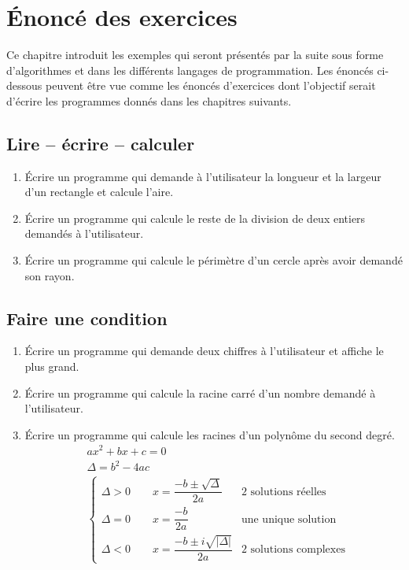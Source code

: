\chapter{Énoncé des exercices}

Ce chapitre introduit les exemples qui seront présentés par la suite sous forme d'algorithmes et dans les différents langages de programmation. Les énoncés ci-dessous peuvent être vue comme les énoncés d'exercices dont l'objectif serait d'écrire les programmes donnés dans les chapitres suivants.

\section{Lire -- écrire -- calculer}

\begin{enumerate}
    \item Écrire un programme qui demande à l'utilisateur la longueur et la largeur d'un rectangle et calcule l'aire.
    \item Écrire un programme qui calcule le reste de la division de deux entiers demandés à l'utilisateur.
    \item Écrire un programme qui calcule le périmètre d'un cercle après avoir demandé son rayon.
\end{enumerate}

\section{Faire une condition}

\begin{enumerate}
    \item Écrire un programme qui demande deux chiffres à l'utilisateur et affiche le plus grand.
    
    \item Écrire un programme qui calcule la racine carré d'un nombre demandé à l'utilisateur.
    
    \item Écrire un programme qui calcule les racines d'un polynôme du second degré.
    \begin{align*}
        & a x^2 + b x + c = 0 \\
        & \Delta = b^2 - 4 a c \\
        &
        \begin{cases}
            \Delta > 0 \qquad x = \dfrac{-b \pm \sqrt{\Delta}}{2a} & \text{2 solutions réelles} \\
            \Delta = 0 \qquad x = \dfrac{-b}{2a} & \text{une unique solution} \\
            \Delta < 0 \qquad x = \dfrac{-b \pm i\sqrt{|\Delta|}}{2a} & \text{2 solutions complexes}
        \end{cases}
    \end{align*}
\end{enumerate}

